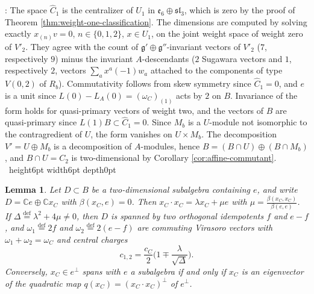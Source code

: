\documentclass[leqno]{article}
\newcommand{\Cbb}{\ensuremath{\mathbb{C}}}
\newcommand{\qed}{\hfill \vrule height6pt  width6pt depth0pt}
\newcommand{\ov}{\overset}
\newtheorem{lemma}[thm]{Lemma}
\newenvironment{proof}[1][]{\noindent {\it Proof #1} : }{\hbox{~}\qed
\smallskip
}
\numberwithin{equation}{section}
\begin{document}
\begin{proof}
The space $\widehat C_1$ is the centralizer of $U_1$ in $\mathfrak e_6 \oplus \mathfrak{sl}_3$, which is zero by the proof of Theorem \ref{thm:weight-one-classification}. The dimensions are computed by solving exactly $x_{(n)}v = 0$, $n \in \{0,1,2\}$, $x \in U_1$, on the joint weight space of weight zero of $V'_2$. They agree with the count of $\mathfrak g' \oplus \mathfrak g''$-invariant vectors of $V'_2$ ($7$, respectively $9$) minus the invariant $A$-descendants ($2$ Sugawara vectors and $1$, respectively $2$, vectors $\sum_a x^a(-1)w_a$ attached to the components of type $V(0,2)$ of $R_b$). Commutativity follows from skew symmetry since $\widehat C_1 = 0$, and $e$ is a unit since $L(0)-L_A(0) = (\omega_C)_{(1)}$ acts by $2$ on $B$. Invariance of the form holds for quasi-primary vectors of weight two, and the vectors of $B$ are quasi-primary since $L(1)B \subset \widehat C_1 = 0$. Since $M_b$ is a $U$-module not isomorphic to the contragredient of $U$, the form vanishes on $U \times M_b$. The decomposition $V' = U \oplus M_b$ is a decomposition of $A$-modules, hence $B = (B \cap U) \oplus (B \cap M_b)$, and $B \cap U = C_2$ is two-dimensional by Corollary \ref{cor:affine-commutant}.
\end{proof}

\begin{lemma}
\label{lem:two-dim-subalgebras}
Let $D \subset B$ be a two-dimensional subalgebra containing $e$, and write $D = \Cbb e \oplus \Cbb x_C$ with $\beta(x_C,e) = 0$. Then $x_C \cdot x_C = \lambda x_C+\mu e$ with $\mu = \frac{\beta(x_C,x_C)}{\beta(e,e)}$. If $\Delta \ov{\mathrm{def}}{=} \lambda^2+4\mu \neq 0$, then $D$ is spanned by two orthogonal idempotents $f$ and $e-f$, and $\omega_1 \ov{\mathrm{def}}{=} 2f$ and $\omega_2 \ov{\mathrm{def}}{=} 2(e-f)$ are commuting Virasoro vectors with $\omega_1+\omega_2 = \omega_C$ and central charges
\begin{equation}
\label{eq:charges-split}
c_{1,2} = \frac{c_C}{2}\Big(1 \mp \frac{\lambda}{\sqrt{\Delta}}\Big).
\end{equation}
Conversely, $x_C \in e^\perp$ spans with $e$ a subalgebra if and only if $x_C$ is an eigenvector of the quadratic map $q(x_C) = (x_C \cdot x_C)^\perp$ of $e^\perp$.
\end{lemma}
\end{document}
